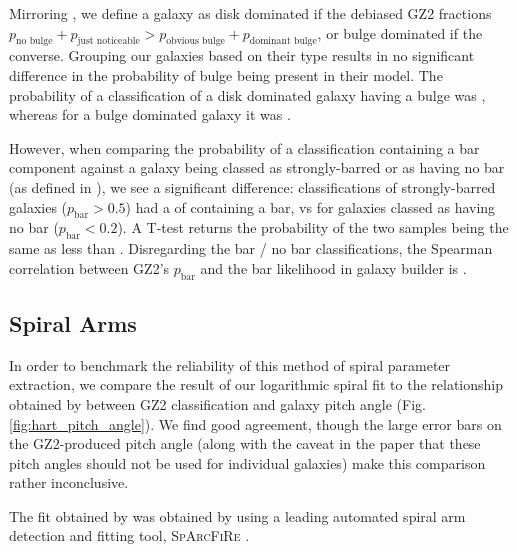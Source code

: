 \documentclass[../main.tex]{subfiles}
\begin{document}
Mirroring \citet{Kruk2017:1710.00093v2}, we define a galaxy as disk dominated if the debiased GZ2 fractions $p_\text{no bulge} + p_\text{just noticeable} > p_\text{obvious bulge} + p_\text{dominant bulge}$, or bulge dominated if the converse. Grouping our galaxies based on their type results in no significant difference in the probability of bulge being present in their model. The probability of a classification of a disk dominated galaxy having a bulge was , whereas for a bulge dominated galaxy it was .

However, when comparing the probability of a classification containing a bar component against a galaxy being classed as strongly-barred or as having no bar (as defined in \citealt{Masters2010:1003.0449v2}), we see a significant difference: classifications of strongly-barred galaxies ($p_\text{bar} > 0.5$) had a  of containing a bar, vs  for galaxies classed as having no bar ($p_\text{bar} < 0.2$). A T-test returns the probability of the two samples being the same as less than . Disregarding the bar / no bar classifications, the Spearman correlation between GZ2's $p_\text{bar}$ and the bar likelihood in galaxy builder is .






\subsection{Spiral Arms}

In order to benchmark the reliability of this method of spiral parameter extraction, we compare the result of our logarithmic spiral fit to the relationship obtained by \citet{Hart2016:1607.01019v1} between GZ2 classification and galaxy pitch angle (Fig.\ref{fig:hart_pitch_angle}). We find good agreement, though the large error bars on the GZ2-produced pitch angle (along with the caveat in the paper that these pitch angles should not be used for individual galaxies) make this comparison rather inconclusive.

The fit obtained by \citet{Hart2016:1607.01019v1} was obtained by using a leading automated spiral arm detection and fitting tool, \textsc{SpArcFiRe} \citep{Davis2014:1402.1910v1}.
\end{document}
